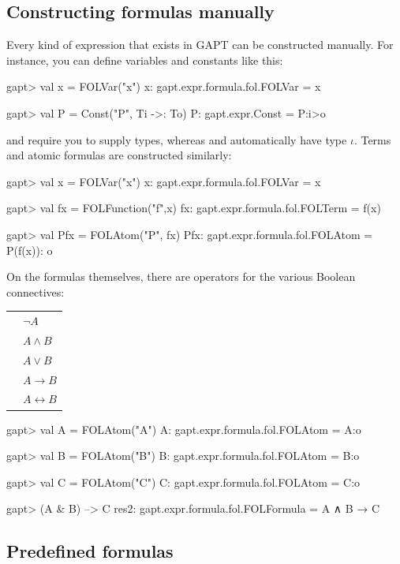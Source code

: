 \documentclass[a4paper,11pt]{book}
\newcommand{\impl}{\to} %
\newcommand{\cli}[1]{{\ttfamily {#1}}}
\begin{document}
\subsection{Constructing formulas manually}
Every kind of expression that exists in GAPT can be constructed manually. For instance, you can define variables
and constants like this:
\begin{clilisting}
gapt> val x = FOLVar("x")
x: gapt.expr.formula.fol.FOLVar = x

gapt> val P = Const("P", Ti ->: To)
P: gapt.expr.Const = P:i>o

\end{clilisting}
\cli{Var} and \cli{Const} require you to supply types, whereas \cli{FOLVar} and
\cli{FOLConst} automatically have type $\iota$. Terms and atomic formulas are constructed
similarly:
\begin{clilisting}
gapt> val x = FOLVar("x")
x: gapt.expr.formula.fol.FOLVar = x

gapt> val fx = FOLFunction("f",x)
fx: gapt.expr.formula.fol.FOLTerm = f(x)

gapt> val Pfx = FOLAtom("P", fx)
Pfx: gapt.expr.formula.fol.FOLAtom = P(f(x)): o

\end{clilisting}

On the formulas themselves, there are operators for the various Boolean connectives:

\begin{tabular}{r l}
 \cli{-A} & $\neg A$\\
 \cli{A \& B} & $A \wedge B$\\
 \cli{A | B} & $A \vee B$\\
 \cli{A --> B} & $A \impl B$\\
 \cli{A <-> B} & $A \leftrightarrow B$
\end{tabular}
 
\begin{clilisting}
gapt> val A = FOLAtom("A")
A: gapt.expr.formula.fol.FOLAtom = A:o

gapt> val B = FOLAtom("B")
B: gapt.expr.formula.fol.FOLAtom = B:o

gapt> val C = FOLAtom("C")
C: gapt.expr.formula.fol.FOLAtom = C:o

gapt> (A & B) --> C
res2: gapt.expr.formula.fol.FOLFormula = A ∧ B → C

\end{clilisting}

\subsection{Predefined formulas}
\end{document}
